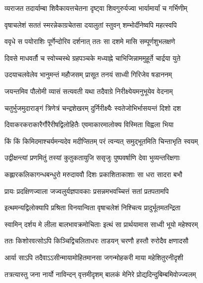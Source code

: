 
\addtocounter{shlokacount}{33}

\twolineshloka
{व्यराजत तदार्याम्बा शिवैकायत्तचेतना}
{दृष्ट्वा शिवगुरुर्यज्वा भार्यामार्यां च गर्भिणीम्} %

\twolineshloka
{वृषाचलेशं सततं स्मरन्नेकाग्रचेतसा}
{दयालुतां स्तुवन् शम्भोर्दीनेष्वपि महत्स्वपि} %

\twolineshloka
{ववृधे स पयोराशिः पूर्णेन्दोरिव दर्शनात्}
{ततः सा दशमे मासि सम्पूर्णशुभलक्षणे} %

\twolineshloka
{दिवसे माधवर्तौ च स्वोच्चस्थे ग्रहपञ्चके}
{मध्याह्ने चाभिजिन्नाममुहूर्ते चार्द्रया युते} %

\twolineshloka
{उदयाचलवेलेव भानुमन्तं महौजसम्}
{प्रासूत तनयं साध्वी गिरिजेव षडाननम्} %

\twolineshloka
{जयन्तमिव पौलोमी व्यासं सत्यवती यथा}
{तदैवाग्रे निरीक्ष्येयमनुभूयेव वेदनाम्} %

\twolineshloka
{चतुर्भुजमुदाराङ्गं त्रिणेत्रं चन्द्रशेखरम्}
{दुर्निरीक्ष्यैः स्वतेजोभिर्भासयन्तं दिशो दश} %

\twolineshloka
{दिवाकरकराकारैर्गौरैरीषद्विलोहितैः}
{एवमाकारमालोक्य विस्मिता विह्वला भिया} %

\twolineshloka
{किं किं किमिदमाश्चर्यमन्यदेव मदीप्सितम्}
{परं त्वन्यत् समुद्भूतमिति चिन्ताभृति स्वयम्} %

\twolineshloka
{उद्वीक्षन्त्यां प्रणमितुं तस्यां कुतुकतायुजि}
{ससृजुः पुष्पवर्षाणि देवा भुव्यन्तरिक्षगाः} %

\twolineshloka
{कह्लारकलिकागन्धबन्धुरो मरुदाववौ}
{दिशः प्रकाशिताकाशाः सा धरा सादरा बभौ} %

\twolineshloka
{प्रायः प्रदक्षिणज्वाला जज्वलुर्यज्ञपावकाः}
{प्रसन्नमभवच्चित्तं सतां प्रतपतामपि} %

\twolineshloka
{इत्थमन्यद्विलोक्यापि प्रश्रिता विनयान्विता}
{वृषाचलेशं निश्चित्य प्रादुर्भूतमतन्द्रिता} %

\twolineshloka
{स्वामिन् दर्शय मे लीला बालभावक्रमोचिताः}
{इत्थं सा प्रार्थयामास साध्वी भूयो महेश्वरम्} %

\twolineshloka
{ततः किशोरवत्सोऽपि किञ्चिद्विचलिताधरः}
{ताडयन् चरणौ हस्तौ रुरोदैव क्षणादसौ} %

\twolineshloka
{आर्या साऽपि तदैवाऽऽसीन्मायामोहितमानसा}
{जगन्मोहकरी माया महेशितुरनीदृशी} %

\twolineshloka
{तत्रत्यास्तु जना नार्यो नाविन्दन् वृत्तमीदृशम्}
{बालकं मेनिरे प्रोद्यदिन्दुबिम्बमिवोज्ज्वलम्} %

